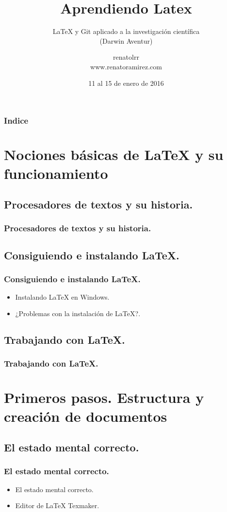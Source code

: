 \documentclass{beamer}
\title[Latex]{Aprendiendo Latex}
\subtitle{LaTeX y Git aplicado a la investigación científica\\ (Darwin Aventur)}
\author[Renato L. Ramírez Rivero]
{renatolrr\\
www.renatoramirez.com}
\date{11 al 15 de enero de 2016}
\begin{document}
\frame{\titlepage}

\begin{frame}
\frametitle{Indice}
\tableofcontents
\end{frame}

\section{Nociones básicas de LaTeX y su funcionamiento}
\subsection{Procesadores de textos y su historia.}

\begin{frame}
  \frametitle{Procesadores de textos y su historia.}
\end{frame}

\subsection{Consiguiendo e instalando LaTeX.}
\begin{frame}
  \frametitle{Consiguiendo e instalando LaTeX.}
  \begin{itemize}
  \item<1->{Instalando LaTeX en Windows.}
  \item<2->{¿Problemas con la instalación de LaTeX?.}
   \end{itemize}
\end{frame}


\subsection{Trabajando con LaTeX.}
\begin{frame}
  \frametitle{Trabajando con LaTeX.}
\end{frame}

\section{Primeros pasos. Estructura y creación de documentos}
\subsection{El estado mental correcto.}
\begin{frame}
  \frametitle{El estado mental correcto.}
 \begin{itemize}
  \item<1->{El estado mental correcto.}
  \item<2->{Editor de LaTeX Texmaker.}
  \end{itemize}
\end{frame}
\end{document}
